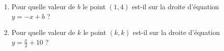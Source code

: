 
\begin{exercice}\label{exosmath-0234}

    \begin{enumerate}
        \item
            Pour quelle valeur de \( b\) le point \( (1,4)\) est-il sur la droite d'équation \( y=-x+b\) ?
        \item
            Pour quelle valeur de \( k\) le point \( (k,k)\) est-il sur la droite d'équation \( y=\frac{ x }{2}+10\) ?
    \end{enumerate}

\end{exercice}
